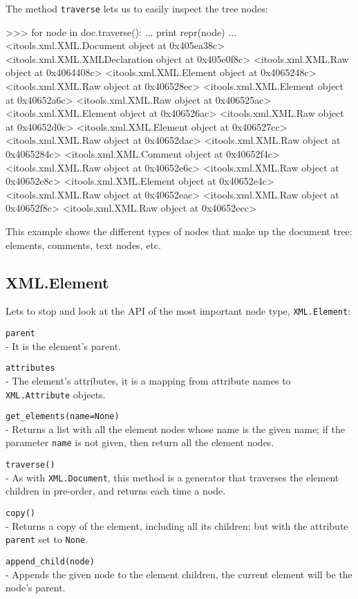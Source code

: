 The method {\tt traverse} lets us to easily inspect the tree nodes:

\begin{code}
    >>> for node in doc.traverse():
    ...     print repr(node)
    ... 
    <itools.xml.XML.Document object at 0x405ea38c>
    <itools.xml.XML.XMLDeclaration object at 0x405e0f8c>
    <itools.xml.XML.Raw object at 0x4064408c>
    <itools.xml.XML.Element object at 0x4065248c>
    <itools.xml.XML.Raw object at 0x406528ec>
    <itools.xml.XML.Element object at 0x40652a6c>
    <itools.xml.XML.Raw object at 0x406525ac>
    <itools.xml.XML.Element object at 0x406526ac>
    <itools.xml.XML.Raw object at 0x40652d0c>
    <itools.xml.XML.Element object at 0x406527cc>
    <itools.xml.XML.Raw object at 0x40652dac>
    <itools.xml.XML.Raw object at 0x4065284c>
    <itools.xml.XML.Comment object at 0x40652f4c>
    <itools.xml.XML.Raw object at 0x40652e6c>
    <itools.xml.XML.Raw object at 0x40652e8c>
    <itools.xml.XML.Element object at 0x40652e4c>
    <itools.xml.XML.Raw object at 0x40652eac>
    <itools.xml.XML.Raw object at 0x40652f8c>
    <itools.xml.XML.Raw object at 0x40652ecc>
\end{code}

This example shows the different types of nodes that make up the document
tree: elements, comments, text nodes, etc.

\subsection{XML.Element}

Lets to stop and look at the API of the most important node type,
{\tt XML.Element}:

\begin{api}
    {\tt parent}\\
    - It is the element's parent.

    {\tt attributes}\\
    - The element's attributes, it is a mapping from attribute names to
    {\tt XML.Attribute} objects.

    {\tt get\_elements(name=None)}\\
    - Returns a list with all the element nodes whose name is the given
    name; if the parameter {\tt name} is not given, then return all the
    element nodes.

    {\tt traverse()}\\
    - As with {\tt XML.Document}, this method is a generator that traverses
    the element children in pre-order, and returns each time a node.

    {\tt copy()}\\
    - Returns a copy of the element, including all its children; but with
    the attribute {\tt parent} set to {\tt None}.

    {\tt append\_child(node)}\\
    - Appends the given node to the element children, the current element will
    be the node's parent.
\end{api}


